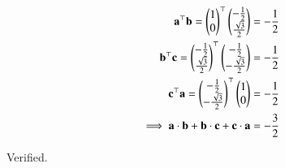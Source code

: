 \documentclass[journal,12pt,twocolumn]{IEEEtran}
\let\vec\mathbf
\begin{document}
\begin{enumerate}[start=13]
\begin{align}
    \vec{a}^{\top}\vec{b} = \myvec{1\\0}^{\top}\myvec{-\frac{1}{2}\\\frac{\sqrt{3}}{2}} &= -\frac{1}{2} \\
    \vec{b}^{\top}\vec{c} = \myvec{-\frac{1}{2}\\\frac{\sqrt{3}}{2}}^{\top}\myvec{-\frac{1}{2}\\-\frac{\sqrt{3}}{2}} &= -\frac{{1}}{2} \\
    \vec{c}^{\top}\vec{a} = \myvec{-\frac{1}{2}\\-\frac{\sqrt{3}}{2}}^{\top}\myvec{1\\0} &= -\frac{1}{2} \\
    \implies \vec{a} \cdot \vec{b} + \vec{b} \cdot \vec{c} + \vec{c} \cdot \vec{a} &= -\frac{3}{2}
\end{align}

Verified.
\end{enumerate}
\end{document}
